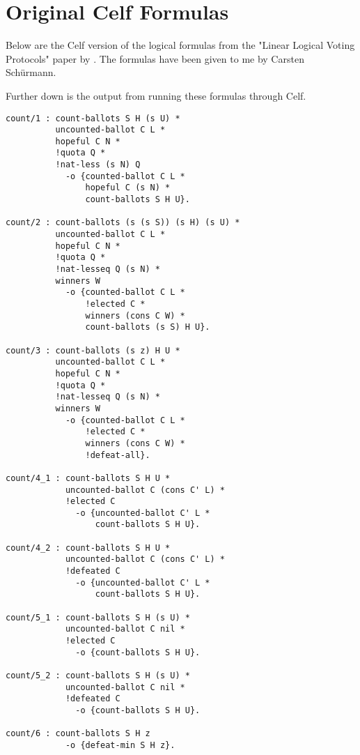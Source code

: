 \chapter{Original Celf Formulas}
\label{A_04}

Below are the Celf version of the logical formulas from the "{L}inear {L}ogical {V}oting {P}rotocols"\cite{Deyoung11} paper by \citeauthor{Deyoung11}. The formulas have been given to me by Carsten Sch{\"u}rmann. 

Further down is the output from running these formulas through Celf.

\begin{lstlisting}[basicstyle=\footnotesize\ttfamily,numbers=none]
count/1 : count-ballots S H (s U) *
          uncounted-ballot C L *
          hopeful C N *
          !quota Q *
          !nat-less (s N) Q
            -o {counted-ballot C L *
                hopeful C (s N) *
                count-ballots S H U}.

count/2 : count-ballots (s (s S)) (s H) (s U) *
          uncounted-ballot C L *
          hopeful C N *
          !quota Q *
          !nat-lesseq Q (s N) *
          winners W
            -o {counted-ballot C L *
                !elected C *
                winners (cons C W) *
                count-ballots (s S) H U}.

count/3 : count-ballots (s z) H U *
          uncounted-ballot C L *
          hopeful C N *
          !quota Q *
          !nat-lesseq Q (s N) *
          winners W
            -o {counted-ballot C L *
                !elected C *
                winners (cons C W) *
                !defeat-all}.

count/4_1 : count-ballots S H U *
            uncounted-ballot C (cons C' L) *
            !elected C
              -o {uncounted-ballot C' L *
                  count-ballots S H U}.

count/4_2 : count-ballots S H U *
            uncounted-ballot C (cons C' L) *
            !defeated C
              -o {uncounted-ballot C' L *
                  count-ballots S H U}.

count/5_1 : count-ballots S H (s U) *
            uncounted-ballot C nil *
            !elected C
              -o {count-ballots S H U}.

count/5_2 : count-ballots S H (s U) *
            uncounted-ballot C nil *
            !defeated C
              -o {count-ballots S H U}.

count/6 : count-ballots S H z
            -o {defeat-min S H z}.


\end{lstlisting}
